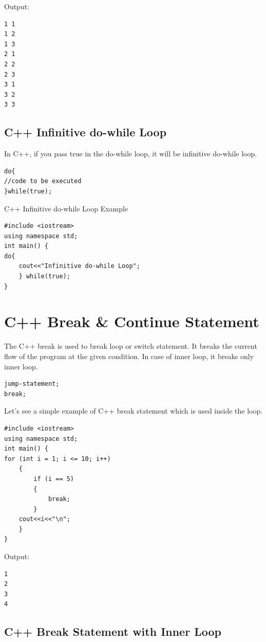 \documentclass{book}
\begin{document}
Output:

\begin{lstlisting}
1 1
1 2
1 3
2 1
2 2 
2 3
3 1
3 2
3 3
\end{lstlisting}

\subsection{C++ Infinitive do-while Loop}

In C++, if you pass true in the do-while loop, it will be infinitive do-while loop.

\begin{lstlisting}
do{    
//code to be executed    
}while(true);  
\end{lstlisting}

C++ Infinitive do-while Loop Example

\begin{lstlisting}
#include <iostream>  
using namespace std;  
int main() {  
do{    
	cout<<"Infinitive do-while Loop";    
	} while(true);     
}  
\end{lstlisting}

\section{C++ Break \& Continue Statement}

The C++ break is used to break loop or switch statement. It breaks the current flow of the program at the given condition. In case of inner loop, it breaks only inner loop.

\begin{lstlisting}
jump-statement;      
break;  
\end{lstlisting}

Let's see a simple example of C++ break statement which is used inside the loop.

\begin{lstlisting}
#include <iostream>  
using namespace std;  
int main() {  
for (int i = 1; i <= 10; i++)    
	{    
		if (i == 5)    
		{    
			break;    
		}    
	cout<<i<<"\n";    
	}    
}  
\end{lstlisting}

Output:

\begin{lstlisting}
1
2
3
4
\end{lstlisting}

\subsection{C++ Break Statement with Inner Loop}
\end{document}
